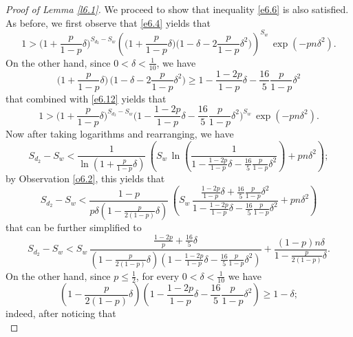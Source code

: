 \documentclass[10pt]{amsart}
\theoremstyle{remark}
\newcommand{\meg}{\geqslant}
\newcommand{\mik}{\leqslant}
\begin{document}
\begin{proof}[Proof of Lemma \emph{\ref{l6.1}}]
We proceed to show that inequality \eqref{e6.6} is also satisfied.
As before, we first observe that \eqref{e6.4} yields that
\begin{equation} \label{e6.12}
1 > \Big(1+\frac{p}{1-p}\delta\Big)^{S_{d_2}-S_w}
\left(\big(1+\frac{p}{1-p}\delta\big)\big(1-\delta-2\frac{p}{1-p}\delta^2\big)\right)^{S_w}\, \exp(-pn\delta^2).
\end{equation}
On the other hand, since $0<\delta<\frac{1}{10}$, we have
\begin{equation} \label{e6.13}
\Big(1+\frac{p}{1-p}\delta\Big)\, \Big(1-\delta-2\frac{p}{1-p}\delta^2\Big)\meg
1-\frac{1-2p}{1-p}\delta-\frac{16}{5}\frac{p}{1-p}\delta^2
\end{equation}
that combined with \eqref{e6.12} yields that
\begin{equation} \label{e6.14}
1 > \Big(1+\frac{p}{1-p}\delta\Big)^{S_{d_2}-S_w}
\Big(1-\frac{1-2p}{1-p}\delta-\frac{16}{5}\frac{p}{1-p}\delta^2\Big)^{S_w}\, \exp(-pn\delta^2).
\end{equation}
Now after taking logarithms and rearranging, we have
\begin{equation} \label{e6.15}
S_{d_2}-S_w < \frac{1}{\ln\left(1+\frac{p}{1-p}\delta\right)} \,
\left(S_w\, \ln\left(\frac{1}{1-\frac{1-2p}{1-p}\delta-\frac{16}{5}\frac{p}{1-p}\delta^2}\right)+pn\delta^2\right);
\end{equation}
by Observation \ref{o6.2}, this yields that
\begin{equation} \label{e6.16}
S_{d_2}-S_w < \frac{1-p}{p\delta\left(1-\frac{p}{2(1-p)}\delta\right)} \,
\left(S_w\, \frac{\frac{1-2p}{1-p}\delta+\frac{16}{5}
\frac{p}{1-p}\delta^2}{1-\frac{1-2p}{1-p}\delta-\frac{16}{5}\frac{p}{1-p}\delta^2} + pn\delta^2\right)
\end{equation}
that can be further simplified to
\begin{equation} \label{e6.17}
S_{d_2}-S_w <  S_w\, \frac{\frac{1-2p}{p}+\frac{16}{5}\delta}{\left(1-\frac{p}{2(1-p)}\delta\right)
\left(1-\frac{1-2p}{1-p}\delta-\frac{16}{5}\frac{p}{1-p}\delta^2\right)}+
\frac{(1-p)n\delta}{1-\frac{p}{2(1-p)}\delta}.
\end{equation}
On the other hand, since $p\mik \frac12$, for every $0<\delta<\frac{1}{10}$ we have
\begin{equation} \label{e6.18}
\left(1-\frac{p}{2(1-p)}\delta\right)
\left(1-\frac{1-2p}{1-p}\delta-\frac{16}{5}\frac{p}{1-p}\delta^2\right)\meg 1-\delta;
\end{equation}
indeed, after noticing that
\begin{equation} \label{en.6.2}

\end{equation}
\end{proof}
\end{document}
